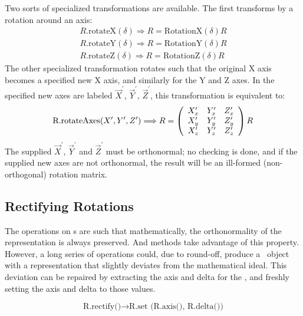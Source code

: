 Two sorts of specialized transformations are available.  The first transforms
by a rotation around an axis:
\begin{eqnarray}
\label{eq:xyzrot}
  R\mbox{.rotateX}(\delta) \Longrightarrow R = \mbox{RotationX}(\delta) R \\
\nonumber
  R\mbox{.rotateY}(\delta) \Longrightarrow R = \mbox{RotationY}(\delta) R \\
\nonumber
  R\mbox{.rotateZ}(\delta) \Longrightarrow R = \mbox{RotationZ}(\delta) R 
\end{eqnarray}
\noindent
The other specialized transformation rotates such that the original X axis
becomes a specified new X axis, and similarly for the Y and Z axes.
In the specified new axes are labeled $\vec{X}^\prime$, $\vec{Y}^\prime$, 
$\vec{Z}^\prime$, this transformation is equivalent to:
\begin{equation}
\label{eq:rotaxes}
\mbox{R.rotateAxes}(X^\prime, Y^\prime, Z^\prime) \Longrightarrow
{\boldmath R} = 
\left(
\begin{array}{ccc}
X^\prime_x & Y^\prime_x & Z^\prime_x \\
X^\prime_y & Y^\prime_y & Z^\prime_y \\
X^\prime_z & Y^\prime_z & Z^\prime_z 
\end{array}
\right)
{\boldmath R} 
\end{equation}
\noindent
The supplied 
$\vec{X}^\prime$, $\vec{Y}^\prime$ and $\vec{Z}^\prime$ must be orthonormal;
no checking is done, and if the supplied new axes are not orthonormal, the
result will be an ill-formed (non-orthogonal) rotation matrix.

\subsection{Rectifying Rotations}

The operations on \Ro s are such that mathematically, the orthonormality of 
the representation is always preserved.  And methods take advantage of this 
property. 
However, a long series of operations could, due to round-off, produce a 
\Ro\ object with a representation that slightly deviates from the  
mathematical
ideal.  This deviation can be repaired by extracting the axis and delta
for the \Ro, and freshly setting the axis and delta to those values.

\begin{equation}
\label{eq:rectRot}
\mbox{R.rectify()} \rightarrow \mbox{R.set (R.axis(), R.delta())}
\end{equation}

